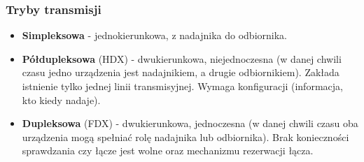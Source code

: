 \documentclass[a4paper,twoside]{article}
\begin{document}
		\subsubsection{Tryby transmisji}
		\begin{itemize}
			\item \textbf{Simpleksowa} - jednokierunkowa, z nadajnika do odbiornika.
			\item \textbf{Półdupleksowa} (HDX) - dwukierunkowa, niejednoczesna (w danej chwili czasu jedno urządzenia jest nadajnikiem, a drugie odbiornikiem). Zakłada istnienie tylko jednej linii transmisyjnej. Wymaga konfiguracji (informacja, kto kiedy nadaje).
			\item \textbf{Dupleksowa} (FDX) - dwukierunkowa, jednoczesna (w danej chwili czasu oba urządzenia mogą spełniać rolę nadajnika lub odbiornika). Brak konieczności sprawdzania czy łącze jest wolne oraz mechanizmu rezerwacji łącza.
		\end{itemize}
\end{document}
